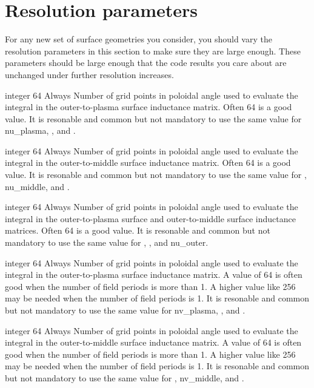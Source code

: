 \section{Resolution parameters}

For any new set of surface geometries you consider, you should vary the resolution parameters in this section to make sure
they are large enough.  These parameters should be large enough that the code results you care about are unchanged under further
resolution increases.

\myhrule

{integer}
{64}
{Always}
{Number of grid points in poloidal angle used to evaluate the integral  in the outer-to-plasma surface inductance matrix.
Often 64 is a good value.
It is resonable and common but not mandatory to use the same value for nu\_plasma, , and .}

\myhrule

{integer}
{64}
{Always}
{Number of grid points in poloidal angle used to evaluate the integral  in the outer-to-middle surface inductance matrix.
Often 64 is a good value.
It is resonable and common but not mandatory to use the same value for , nu\_middle, and .}

\myhrule

{integer}
{64}
{Always}
{Number of grid points in poloidal angle used to evaluate the integral  in the outer-to-plasma surface and outer-to-middle surface inductance matrices.
Often 64 is a good value.
It is resonable and common but not mandatory to use the same value for , , and nu\_outer.}

\myhrule

{integer}
{64}
{Always}
{Number of grid points in poloidal angle used to evaluate the integral  in the outer-to-plasma surface inductance matrix.
A value of 64 is often good when the number of field periods is more than 1. A higher value like 256 may be needed when the number of field periods is 1.
It is resonable and common but not mandatory to use the same value for nv\_plasma, , and .}

\myhrule

{integer}
{64}
{Always}
{Number of grid points in poloidal angle used to evaluate the integral  in the outer-to-middle surface inductance matrix.
A value of 64 is often good when the number of field periods is more than 1. A higher value like 256 may be needed when the number of field periods is 1.
It is resonable and common but not mandatory to use the same value for , nv\_middle, and .}

